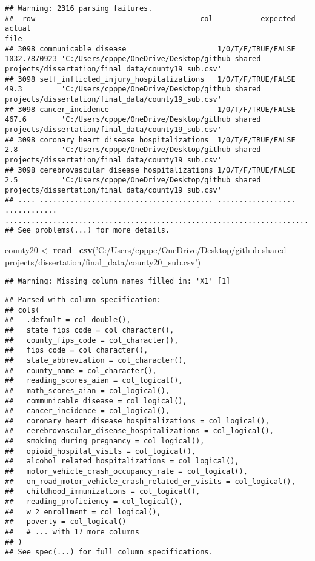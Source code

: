 \documentclass[
]{article}
\newenvironment{Shaded}{\begin{snugshade}}{\end{snugshade}}
\newcommand{\KeywordTok}[1]{\textcolor[rgb]{0.13,0.29,0.53}{\textbf{#1}}}
\newcommand{\NormalTok}[1]{#1}
\newcommand{\StringTok}[1]{\textcolor[rgb]{0.31,0.60,0.02}{#1}}
\begin{document}
\begin{verbatim}
## Warning: 2316 parsing failures.
##  row                                      col           expected       actual                                                                                              file
## 3098 communicable_disease                     1/0/T/F/TRUE/FALSE 1032.7870923 'C:/Users/cpppe/OneDrive/Desktop/github shared projects/dissertation/final_data/county19_sub.csv'
## 3098 self_inflicted_injury_hospitalizations   1/0/T/F/TRUE/FALSE 49.3         'C:/Users/cpppe/OneDrive/Desktop/github shared projects/dissertation/final_data/county19_sub.csv'
## 3098 cancer_incidence                         1/0/T/F/TRUE/FALSE 467.6        'C:/Users/cpppe/OneDrive/Desktop/github shared projects/dissertation/final_data/county19_sub.csv'
## 3098 coronary_heart_disease_hospitalizations  1/0/T/F/TRUE/FALSE 2.8          'C:/Users/cpppe/OneDrive/Desktop/github shared projects/dissertation/final_data/county19_sub.csv'
## 3098 cerebrovascular_disease_hospitalizations 1/0/T/F/TRUE/FALSE 2.5          'C:/Users/cpppe/OneDrive/Desktop/github shared projects/dissertation/final_data/county19_sub.csv'
## .... ........................................ .................. ............ .................................................................................................
## See problems(...) for more details.
\end{verbatim}

\begin{Shaded}
\begin{Highlighting}[]
\NormalTok{county20 <-}\StringTok{ }\KeywordTok{read_csv}\NormalTok{(}\StringTok{'C:/Users/cpppe/OneDrive/Desktop/github shared projects/dissertation/final_data/county20_sub.csv'}\NormalTok{)}
\end{Highlighting}
\end{Shaded}

\begin{verbatim}
## Warning: Missing column names filled in: 'X1' [1]
\end{verbatim}

\begin{verbatim}
## Parsed with column specification:
## cols(
##   .default = col_double(),
##   state_fips_code = col_character(),
##   county_fips_code = col_character(),
##   fips_code = col_character(),
##   state_abbreviation = col_character(),
##   county_name = col_character(),
##   reading_scores_aian = col_logical(),
##   math_scores_aian = col_logical(),
##   communicable_disease = col_logical(),
##   cancer_incidence = col_logical(),
##   coronary_heart_disease_hospitalizations = col_logical(),
##   cerebrovascular_disease_hospitalizations = col_logical(),
##   smoking_during_pregnancy = col_logical(),
##   opioid_hospital_visits = col_logical(),
##   alcohol_related_hospitalizations = col_logical(),
##   motor_vehicle_crash_occupancy_rate = col_logical(),
##   on_road_motor_vehicle_crash_related_er_visits = col_logical(),
##   childhood_immunizations = col_logical(),
##   reading_proficiency = col_logical(),
##   w_2_enrollment = col_logical(),
##   poverty = col_logical()
##   # ... with 17 more columns
## )
## See spec(...) for full column specifications.
\end{verbatim}
\end{document}
